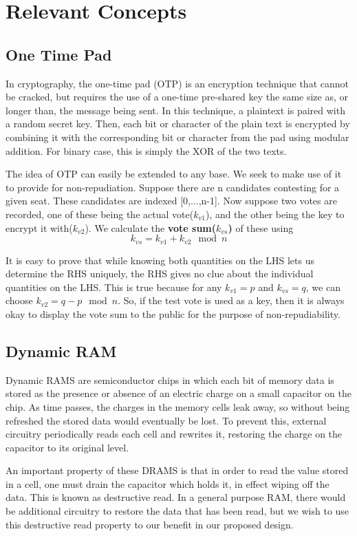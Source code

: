 \documentclass{article}
\begin{document}
\section{Relevant Concepts}
\subsection{One Time Pad}
In cryptography, the one-time pad (OTP) is an encryption technique that cannot be cracked, but requires the use of a one-time pre-shared key the same size as, or longer than, the message being sent. In this technique, a plaintext is paired with a random secret key. Then, each bit or character of the plain text is encrypted by combining it with the corresponding bit or character from the pad using modular addition. For binary case, this is simply the XOR of the two texts.

The idea of OTP can easily be extended to any base. We seek to make use of it to provide for non-repudiation. Suppose there are n candidates contesting for a given seat. These candidates are indexed [0,...,n-1]. Now suppose two votes are recorded, one of these being the actual vote($k_{v1}$), and the other being the key to encrypt it with($k_{v2}$). We calculate the \textbf{vote sum($k_{vs}$)} of these using $$k_{vs}=k_{v1}+k_{v2} \mod n$$

It is easy to prove that while knowing both quantities on the LHS lets us determine the RHS uniquely, the RHS gives no clue about the individual quantities on the LHS. This is true because for any $k_{v1}=p$ and $k_{vs}=q$, we can choose $k_{v2}=q-p \mod{n}$. So, if the test vote is used as a key, then it is always okay to display the vote sum to the public for the purpose of non-repudiability.

\subsection{Dynamic RAM}
Dynamic RAMS are semiconductor chips in which each bit of memory data is stored as the presence or absence of an electric charge on a small capacitor on the chip. As time passes, the charges in the memory cells leak away, so without being refreshed the stored data would eventually be lost. To prevent this, external circuitry periodically reads each cell and rewrites it, restoring the charge on the capacitor to its original level.

An important property of these DRAMS is that in order to read the value stored in a cell, one must drain the capacitor which holds it, in effect wiping off the data. This is known as destructive read. In a general purpose RAM, there would be additional circuitry to restore the data that has been read, but we wish to use this destructive read property to our benefit in our proposed design.
\end{document}
